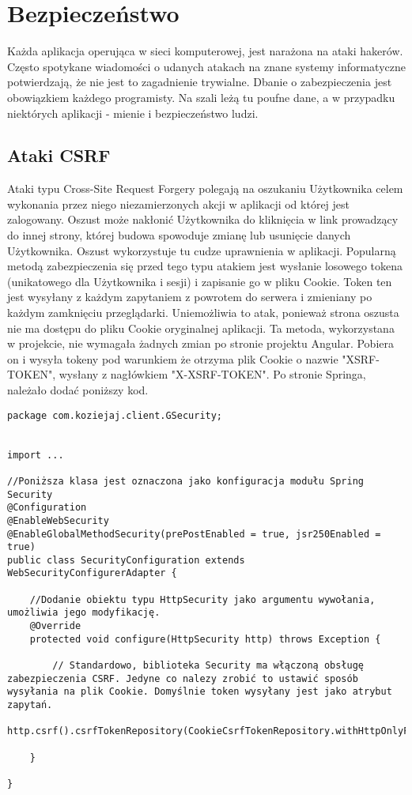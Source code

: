 \documentclass[a4paper,12pt,twoside,openany]{report}
\begin{document}
\chapter{Bezpieczeństwo}
\label{Safety}
Każda aplikacja operująca w sieci komputerowej, jest narażona na ataki hakerów. Często spotykane wiadomości o udanych atakach na znane systemy informatyczne potwierdzają, że nie jest to zagadnienie trywialne. Dbanie o zabezpieczenia jest obowiązkiem każdego programisty. Na szali leżą tu poufne dane, a w przypadku niektórych aplikacji - mienie i bezpieczeństwo ludzi.
\section{Ataki CSRF}
Ataki typu Cross-Site Request Forgery \cite{Owasp} polegają na oszukaniu Użytkownika celem wykonania przez niego niezamierzonych akcji w aplikacji od której jest zalogowany. Oszust może nakłonić Użytkownika do kliknięcia w link prowadzący do innej strony, której budowa spowoduje zmianę lub usunięcie  danych Użytkownika. Oszust wykorzystuje tu cudze uprawnienia w aplikacji. Popularną metodą zabezpieczenia się przed tego typu atakiem jest wysłanie losowego tokena (unikatowego dla Użytkownika i sesji) i zapisanie go w pliku Cookie. Token ten jest wysyłany z każdym zapytaniem z powrotem do serwera i zmieniany po każdym zamknięciu przeglądarki. Uniemożliwia to atak, ponieważ strona oszusta nie ma dostępu do pliku Cookie oryginalnej aplikacji. Ta metoda, wykorzystana w projekcie, nie wymagała żadnych zmian po stronie projektu Angular. Pobiera on i wysyła tokeny pod warunkiem że otrzyma plik Cookie o nazwie "XSRF-TOKEN", wysłany z nagłówkiem "X-XSRF-TOKEN". Po stronie Springa, należało dodać poniższy kod.
\begin{lstlisting}
package com.koziejaj.client.GSecurity;


import ...

//Poniższa klasa jest oznaczona jako konfiguracja modułu Spring Security
@Configuration
@EnableWebSecurity
@EnableGlobalMethodSecurity(prePostEnabled = true, jsr250Enabled = true)
public class SecurityConfiguration extends WebSecurityConfigurerAdapter {

	//Dodanie obiektu typu HttpSecurity jako argumentu wywołania, umożliwia jego modyfikację.
    @Override
    protected void configure(HttpSecurity http) throws Exception {
    
		// Standardowo, biblioteka Security ma włączoną obsługę zabezpieczenia CSRF. Jedyne co nalezy zrobić to ustawić sposób wysyłania na plik Cookie. Domyślnie token wysyłany jest jako atrybut zapytań.
        http.csrf().csrfTokenRepository(CookieCsrfTokenRepository.withHttpOnlyFalse());

    }

}
\end{lstlisting}
\end{document}
